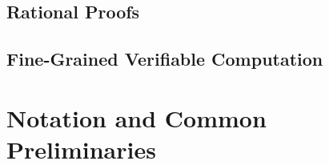 \subsection{Rational Proofs}




%


%

\subsection{Fine-Grained Verifiable Computation}



\section{Notation and Common Preliminaries}


